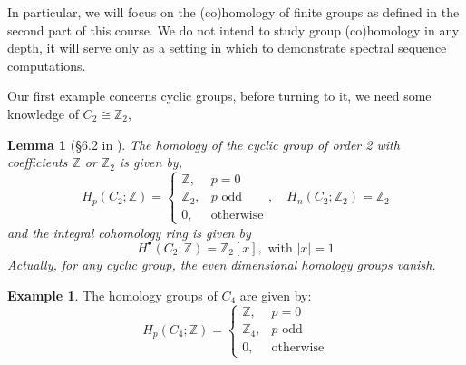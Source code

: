 \documentclass[a4paper,11pt]{article}
\newtheorem{lemma}[theorem]{Lemma}
\theoremstyle{definition}
\newtheorem{example}[theorem]{Example}
\theoremstyle{remark}
\begin{document}
In particular, we will focus on the (co)homology of finite groups as defined in the second part of this course. We do not intend to study group (co)homology in any depth, it will serve only as a setting in which to demonstrate spectral sequence computations.

Our first example concerns cyclic groups, before turning to it, we need some knowledge of $C_2\cong \mathbb{Z}_2$,
\begin{lemma}[\S6.2 in \cite{weibel1994introduction}]
	The homology of the cyclic group of order 2 with coefficients $\mathbb{Z}$ or $\mathbb{Z}_2$ is given by,
	\[
	H_p(C_2;\mathbb{Z})=\begin{cases}
		\mathbb{Z},&p=0\\
		\mathbb{Z}_2,&p \text{~odd}\\
		0,&\text{otherwise}
	\end{cases},\quad H_n(C_2;\mathbb{Z}_2)=\mathbb{Z}_2
	\]
	and the integral cohomology ring is given by
	\[
	H^\bullet(C_2;\mathbb{Z})=\mathbb{Z}_2[x],\text{~with~} |x|=1
	\]
	Actually, for any cyclic group, the even dimensional homology groups vanish.
\end{lemma}
\begin{example}
	The homology groups of $C_4$ are given by:
	\[
		H_p(C_4;\mathbb{Z})=\begin{cases}
		\mathbb{Z},&p=0\\
		\mathbb{Z}_4,&p \text{~odd}\\
		0,&\text{otherwise}
		\end{cases}
	\]
\end{example}
\end{document}
